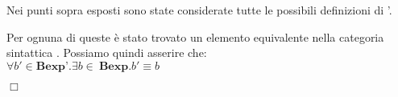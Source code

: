{\begin{enumerate}[label=\alph*)]
\begin{itemize}
  \end{itemize}
\end{enumerate}

Nei punti sopra esposti sono state considerate tutte le possibili definizioni
di \bexp'.

Per ognuna di queste è stato trovato un elemento equivalente nella
categoria sintattica \bexp. Possiamo quindi asserire che: \\

$\forall b' \in \textbf{Bexp'}.\exists b \in \ \textbf{Bexp}.b' \equiv b$

\begin{flushright}
$\Box$
\end{flushright}
}
